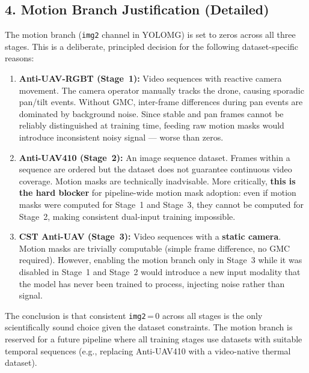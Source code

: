 \subsection*{4. Motion Branch Justification (Detailed)}

The motion branch (\texttt{img2} channel in YOLOMG) is set to zeros
across all three stages. This is a deliberate, principled decision
for the following dataset-specific reasons:

\begin{enumerate}
    \item \textbf{Anti-UAV-RGBT (Stage~1):} Video sequences with
    reactive camera movement. The camera operator manually tracks
    the drone, causing sporadic pan/tilt events. Without GMC,
    inter-frame differences during pan events are dominated by
    background noise. Since stable and pan frames cannot be
    reliably distinguished at training time, feeding raw motion
    masks would introduce inconsistent noisy signal — worse than
    zeros.

    \item \textbf{Anti-UAV410 (Stage~2):} An image sequence dataset.
    Frames within a sequence are ordered but the dataset does not
    guarantee continuous video coverage. Motion masks are technically
    inadvisable. More critically, \textbf{this is the hard blocker}
    for pipeline-wide motion mask adoption: even if motion masks were
    computed for Stage~1 and Stage~3, they cannot be computed for
    Stage~2, making consistent dual-input training impossible.

    \item \textbf{CST Anti-UAV (Stage~3):} Video sequences with a
    \textbf{static camera}. Motion masks are trivially computable
    (simple frame difference, no GMC required). However, enabling
    the motion branch only in Stage~3 while it was disabled in
    Stage~1 and Stage~2 would introduce a new input modality that
    the model has never been trained to process, injecting noise
    rather than signal.
\end{enumerate}

\noindent The conclusion is that consistent \texttt{img2}\,=\,0
across all stages is the only scientifically sound choice given
the dataset constraints. The motion branch is reserved for a
future pipeline where all training stages use datasets with
suitable temporal sequences (e.g., replacing Anti-UAV410 with
a video-native thermal dataset).

